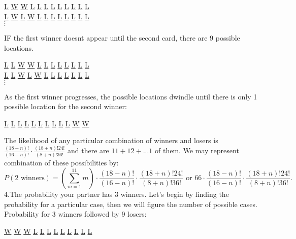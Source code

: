 \documentclass[11pt]{article}
\begin{document}
\begin {center}
  \underline{L} \underline{W} \underline{W} \underline{L} \underline{L} \underline{L} \underline{L} \underline{L} \underline{L} \underline{L} \underline{L} \underline{L}\\
\underline{L} \underline{W} \underline{L} \underline{W} \underline{L} \underline{L} \underline{L} \underline{L} \underline{L} \underline{L} \underline{L} \underline{L}\\
$\vdots$
  \end{center}
IF the first winner doesnt appear until the second card, there are 9 possible locations.
\begin {center}
  \underline{L} \underline{L} \underline{W} \underline{W} \underline{L} \underline{L} \underline{L} \underline{L} \underline{L} \underline{L} \underline{L} \underline{L}\\
\underline{L} \underline{L} \underline{W} \underline{L} \underline{W} \underline{L} \underline{L} \underline{L} \underline{L} \underline{L} \underline{L} \underline{L}\\
$\vdots$
  \end{center}
As the first winner progresses, the possible locations dwindle until there is only 1 possible location for the second winner:
\begin {center}
  \underline{L} \underline{L} \underline{L} \underline{L} \underline{L} \underline{L} \underline{L} \underline{L} \underline{L} \underline{L} \underline{W} \underline{W}\\
  \end{center}
The likelihood of any particular combination of winners and losers is $\frac{(18-n)!}{(16-n)!}\cdot \frac{(18+n)!24!}{(8+n)!36!}$ and there are $11+12+...1$ of them. We may represent combination of these possibilities by:
\begin{equation}
P(2\text{ winners})= \left( \displaystyle\sum_{m=1}^{11} m \right) \cdot \frac{(18-n)!}{(16-n)!}\cdot \frac{(18+n)!24!}{(8+n)!36!} \text{ or } 66 \cdot \frac{(18-n)!}{(16-n)!}\cdot \frac{(18+n)!24!}{(8+n)!36!}.
\end{equation}
\indent 4.The probability your partner has 3 winners. Let's begin by finding the probability for a particular case, then we will figure the number of possible cases. Probability for 3 winners followed by 9 losers:
\begin {center}
  \underline{W} \underline{W} \underline{W} \underline{L} \underline{L} \underline{L} \underline{L} \underline{L} \underline{L} \underline{L} \underline{L} \underline{L}\\
  \end{center}
\end{document}
